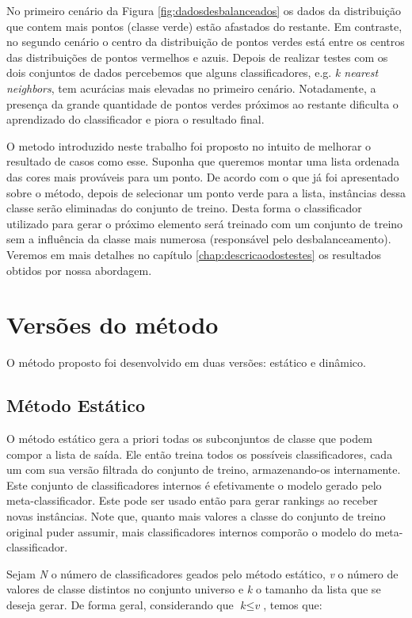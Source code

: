 No primeiro cenário da Figura \ref{fig:dadosdesbalanceados} os dados da distribuição que contem mais pontos (classe verde) estão afastados do restante.
Em contraste, no segundo cenário o centro da distribuição de pontos verdes está entre os centros das distribuições de pontos vermelhos e azuis.
Depois de realizar testes com os dois conjuntos de dados percebemos que alguns classificadores, e.g. \textit{k nearest neighbors}, tem acurácias mais elevadas no primeiro cenário.
Notadamente, a presença da grande quantidade de pontos verdes próximos ao restante dificulta o aprendizado do classificador e piora o resultado final.

O metodo introduzido neste trabalho foi proposto no intuito de melhorar o resultado de casos como esse.
Suponha que queremos montar uma lista ordenada das cores mais prováveis para um ponto.
De acordo com o que já foi apresentado sobre o método, depois de selecionar um ponto verde para a lista, instâncias dessa classe serão eliminadas do conjunto de treino.
Desta forma o classificador utilizado para gerar o próximo elemento será treinado com um conjunto de treino sem a influência da classe mais numerosa (responsável pelo desbalanceamento).
Veremos em mais detalhes no capítulo \ref{chap:descricaodostestes} os resultados obtidos por nossa abordagem.

\section{Versões do método}
\label{sec:versoesdometodo}

O método proposto foi desenvolvido em duas versões: estático e dinâmico.


\subsection{Método Estático}

O método estático gera a priori todas os subconjuntos de classe que podem compor a lista de saída. Ele então treina todos os possíveis classificadores, cada um com sua versão filtrada do conjunto de treino, armazenando-os internamente. Este conjunto de classificadores internos é efetivamente o modelo gerado pelo meta-classificador. Este pode ser usado então para gerar rankings ao receber novas instâncias. Note que, quanto mais valores a classe do conjunto de treino original puder assumir, mais classificadores internos comporão o modelo do meta-classificador.

Sejam \textit{N} o número de classificadores geados pelo método estático, \textit{v} o número de valores de classe distintos no conjunto universo e \textit{k} o tamanho da lista que se deseja gerar. De forma geral, considerando que $\textit{k} \leq \textit{v}$, temos que:

